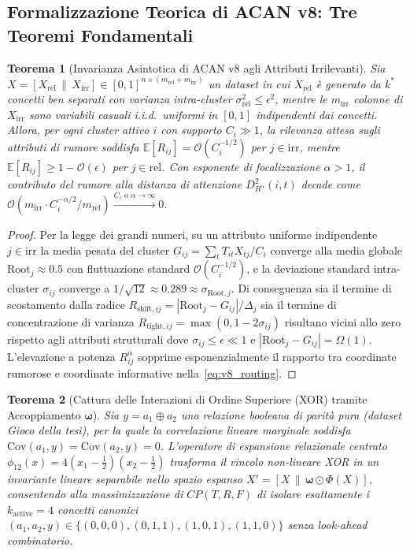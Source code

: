 \documentclass[10pt,a4paper]{article}
\newtheorem{theorem}{Teorema}
\begin{document}
\subsection{Formalizzazione Teorica di ACAN v8: Tre Teoremi Fondamentali}

\begin{theorem}[Invarianza Asintotica di ACAN v8 agli Attributi Irrilevanti]
\label{thm:irrelevant}
Sia $X = [X_{\text{rel}} \,\|\, X_{\text{irr}}] \in [0,1]^{n \times (m_{\text{rel}} + m_{\text{irr}})}$ un dataset in cui $X_{\text{rel}}$ \`e generato da $k^*$ concetti ben separati con varianza intra-cluster $\sigma_{\text{rel}}^2 \le \epsilon^2$, mentre le $m_{\text{irr}}$ colonne di $X_{\text{irr}}$ sono variabili casuali i.i.d.\ uniformi in $[0,1]$ indipendenti dai concetti. Allora, per ogni cluster attivo $i$ con supporto $C_i \gg 1$, la rilevanza attesa sugli attributi di rumore soddisfa $\mathbb{E}[R_{ij}] = \mathcal{O}(C_i^{-1/2})$ per $j \in \text{irr}$, mentre $\mathbb{E}[R_{ij}] \ge 1 - \mathcal{O}(\epsilon)$ per $j \in \text{rel}$. Con esponente di focalizzazione $\alpha > 1$, il contributo del rumore alla distanza di attenzione $D^2_{R^\alpha}(i, t)$ decade come $\mathcal{O}(m_{\text{irr}} \cdot C_i^{-\alpha/2} / m_{\text{rel}}) \xrightarrow{C_i \text{ o } \alpha \to \infty} 0$.
\end{theorem}

\begin{proof}
Per la legge dei grandi numeri, su un attributo uniforme indipendente $j \in \text{irr}$ la media pesata del cluster $G_{ij} = \sum_t T_{it} X_{tj} / C_i$ converge alla media globale $\text{Root}_j \approx 0.5$ con fluttuazione standard $\mathcal{O}(C_i^{-1/2})$, e la deviazione standard intra-cluster $\sigma_{ij}$ converge a $1/\sqrt{12} \approx 0.289 \approx \sigma_{\text{Root}, j}$. Di conseguenza sia il termine di scostamento dalla radice $R_{\text{shift}, ij} = |\text{Root}_j - G_{ij}| / \Delta_j$ sia il termine di concentrazione di varianza $R_{\text{tight}, ij} = \max(0, 1 - 2\sigma_{ij})$ risultano vicini allo zero rispetto agli attributi strutturali dove $\sigma_{ij} \le \epsilon \ll 1$ e $|\text{Root}_j - G_{ij}| = \Omega(1)$. L'elevazione a potenza $R_{ij}^\alpha$ sopprime esponenzialmente il rapporto tra coordinate rumorose e coordinate informative nella~\eqref{eq:v8_routing}.
\end{proof}

\begin{theorem}[Cattura delle Interazioni di Ordine Superiore (XOR) tramite Accoppiamento $\boldsymbol{\omega}$]
\label{thm:xor}
Sia $y = a_1 \oplus a_2$ una relazione booleana di parit\`a pura (dataset \textit{Gioco} della tesi), per la quale la correlazione lineare marginale soddisfa $\text{Cov}(a_1, y) = \text{Cov}(a_2, y) = 0$. L'operatore di espansione relazionale centrato $\phi_{12}(x) = 4(x_1 - \tfrac{1}{2})(x_2 - \tfrac{1}{2})$ trasforma il vincolo non-lineare XOR in un invariante lineare separabile nello spazio espanso $X' = [X \,\|\, \boldsymbol{\omega} \odot \Phi(X)]$, consentendo alla massimizzazione di $CP(T, R, F)$ di isolare esattamente i $k_{\text{active}} = 4$ concetti canonici $(a_1, a_2, y) \in \{(0,0,0), (0,1,1), (1,0,1), (1,1,0)\}$ senza look-ahead combinatorio.
\end{theorem}
\end{document}
